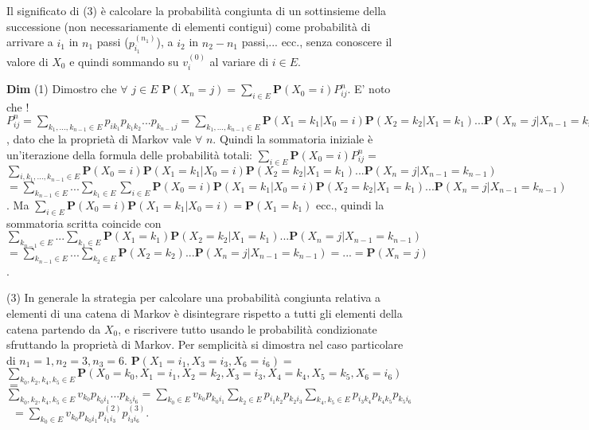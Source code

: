 \documentclass{article}
\begin{document}
Il significato di (3) \`{e} calcolare la probabilit\`{a} congiunta di un
sottinsieme della successione (non necessariamente di elementi contigui)
come probabilit\`{a} di arrivare a $i_{1}$ in $n_{1}$ passi ($%
p_{i_{1}}^{\left( n_{1}\right) }$), a $i_{2}$ in $n_{2}-n_{1}$ passi,...
ecc., senza conoscere il valore di $X_{0}$ e quindi sommando su $%
v_{i}^{\left( 0\right) }$ al variare di $i\in E$.

\textbf{Dim} (1) Dimostro che $\forall $ $j\in E$ $\mathbf{P}\left(
X_{n}=j\right) =\sum_{i\in E}\mathbf{P}\left( X_{0}=i\right) P_{ij}^{n}$. E'
noto che ! $P_{ij}^{n}=\sum_{k_{1},...,k_{n-1}\in
E}p_{ik_{1}}p_{k_{1}k_{2}}...p_{k_{n-1}j}=\sum_{k_{1},...,k_{n-1}\in E}%
\mathbf{P}\left( X_{1}=k_{1}|X_{0}=i\right) \mathbf{P}\left(
X_{2}=k_{2}|X_{1}=k_{1}\right) ...\mathbf{P}\left(
X_{n}=j|X_{n-1}=k_{n-1}\right) $, dato che la propriet\`{a} di Markov vale $%
\forall $ $n$. Quindi la sommatoria iniziale \`{e} un'iterazione della
formula delle probabilit\`{a} totali: $\sum_{i\in E}\mathbf{P}\left(
X_{0}=i\right) P_{ij}^{n}=$ $\sum_{i,k_{1},...,k_{n-1}\in E}\mathbf{P}\left(
X_{0}=i\right) \mathbf{P}\left( X_{1}=k_{1}|X_{0}=i\right) \mathbf{P}\left(
X_{2}=k_{2}|X_{1}=k_{1}\right) ...\mathbf{P}\left(
X_{n}=j|X_{n-1}=k_{n-1}\right) $ $=\sum_{k_{n-1}\in E}...\sum_{k_{1}\in
E}\sum_{i\in E}\mathbf{P}\left( X_{0}=i\right) \mathbf{P}\left(
X_{1}=k_{1}|X_{0}=i\right) \mathbf{P}\left( X_{2}=k_{2}|X_{1}=k_{1}\right)
...\mathbf{P}\left( X_{n}=j|X_{n-1}=k_{n-1}\right) $. Ma $\sum_{i\in E}%
\mathbf{P}\left( X_{0}=i\right) \mathbf{P}\left( X_{1}=k_{1}|X_{0}=i\right) =%
\mathbf{P}\left( X_{1}=k_{1}\right) $ ecc., quindi la sommatoria scritta
coincide con $\sum_{k_{n-1}\in E}...\sum_{k_{1}\in E}\mathbf{P}\left(
X_{1}=k_{1}\right) \mathbf{P}\left( X_{2}=k_{2}|X_{1}=k_{1}\right) ...%
\mathbf{P}\left( X_{n}=j|X_{n-1}=k_{n-1}\right) $ $=\sum_{k_{n-1}\in
E}...\sum_{k_{2}\in E}\mathbf{P}\left( X_{2}=k_{2}\right) ...\mathbf{P}%
\left( X_{n}=j|X_{n-1}=k_{n-1}\right) =...=\mathbf{P}\left( X_{n}=j\right) $.

(3) In generale la strategia per calcolare una probabilit\`{a} congiunta
relativa a elementi di una catena di Markov \`{e} disintegrare rispetto a
tutti gli elementi della catena partendo da $X_{0}$, e riscrivere tutto
usando le probabilit\`{a} condizionate sfruttando la propriet\`{a} di
Markov. Per semplicit\`{a} si dimostra nel caso particolare di $%
n_{1}=1,n_{2}=3,n_{3}=6$. $\mathbf{P}\left(
X_{1}=i_{1},X_{3}=i_{3},X_{6}=i_{6}\right) =$ $\sum_{k_{0},k_{2},k_{4},k_{5}%
\in E}\mathbf{P}\left(
X_{0}=k_{0},X_{1}=i_{1},X_{2}=k_{2},X_{3}=i_{3},X_{4}=k_{4},X_{5}=k_{5},X_{6}=i_{6}\right) 
$ $=$ $\sum_{k_{0},k_{2},k_{4},k_{5}\in
E}v_{k_{0}}p_{k_{0}i_{1}}...p_{k_{5}i_{6}}=\sum_{k_{0}\in
E}v_{k_{0}}p_{k_{0}i_{1}}\sum_{k_{2}\in
E}p_{i_{1}k_{2}}p_{k_{2}i_{3}}\sum_{k_{4},k_{5}\in
E}p_{i_{3}k_{4}}p_{k_{4}k_{5}}p_{k_{5}i_{6}}$ \ $=\sum_{k_{0}\in
E}v_{k_{0}}p_{k_{0}i_{1}}p_{i_{1}i_{3}}^{\left( 2\right)
}p_{i_{3}i_{6}}^{\left( 3\right) }$.
\end{document}
